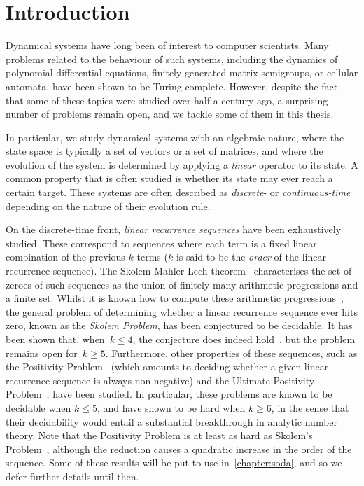 \chapter{Introduction}
\label{sec:introduction}

Dynamical systems have long been of interest to computer scientists. Many problems related to the behaviour of such systems, including the dynamics of polynomial differential equations, finitely generated matrix semigroups, or cellular automata, have been shown to be Turing-complete. However, despite the fact that some of these topics were studied over half a century ago, a surprising number of problems remain open, and we tackle some of them in this thesis.

In particular, we study dynamical systems with an algebraic nature, where the state space is typically a set of vectors or a set of matrices, and where the evolution of the system is determined by applying a \emph{linear} operator to its state. A common property that is often studied is whether its state may ever reach a certain target. These systems are often described as \emph{discrete}- or \emph{continuous-time} depending on the nature of their evolution rule.

On the discrete-time front, \emph{linear recurrence sequences} have been exhaustively studied. These correspond to sequences where each term is a fixed linear combination of the previous $k$ terms ($k$ is said to be the \emph{order} of the linear recurrence sequence). The Skolem-Mahler-Lech theorem~\cite{Sko34,Mah35,Lec53,Hansel85} characterises the set of zeroes of such sequences as the union of finitely many arithmetic progressions and a finite set. Whilst it is known how to compute these arithmetic progressions~\cite{BM76}, the general problem of determining whether a linear recurrence sequence ever hits zero, known as the \emph{Skolem Problem}, has been conjectured to be decidable. It has been shown that, when~$k \leq 4$, the conjecture does indeed hold~\cite{Ver85}, but the problem remains open for~$k\geq 5$.
Furthermore, other properties of these sequences, such as the Positivity Problem~\cite{BG07,HHH06,LT09,OW13:constructive-positivity,OW14:SODA,Liu10} (which amounts to deciding whether a given linear recurrence sequence is always non-negative) and the Ultimate Positivity Problem~\cite{OuaknineW13b}, have been studied.
In particular, these problems are known to be decidable when $k \leq 5$, and have shown to be hard when $k \geq 6$, in the sense that their decidability would entail a substantial breakthrough in analytic number theory. Note that the Positivity Problem is at least as hard as Skolem's Problem~\cite{OW14:SODA}, although the reduction causes a quadratic increase in the order of the sequence. Some of these results will be put to use in~\cref{chapter:soda}, and so we defer further details until then.

